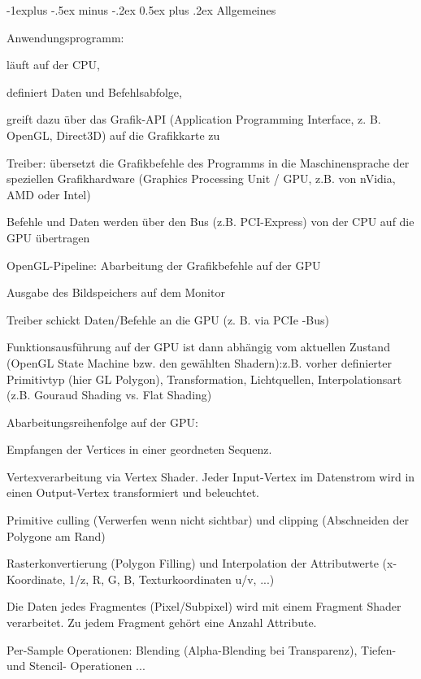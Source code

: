 \documentclass[landscape]{article}
\makeatletter
\renewcommand{\subsection}{\@startsection{subsection}{2}{0mm}%
                                {-1explus -.5ex minus -.2ex}%
                                {0.5ex plus .2ex}%
                                {\normalfont\normalsize\bfseries}}
\makeatother
\begin{document}
\begin{multicols}{3}
  \subsection{Allgemeines}
  \begin{itemize*}
    \item Anwendungsprogramm:
          \begin{itemize*}
            \item läuft auf der CPU,
            \item definiert Daten und Befehlsabfolge,
            \item greift dazu über das Grafik-API (Application Programming Interface, z. B. OpenGL, Direct3D) auf die Grafikkarte zu
          \end{itemize*}
    \item Treiber: übersetzt die Grafikbefehle des Programms in die Maschinensprache der speziellen Grafikhardware (Graphics Processing Unit / GPU, z.B. von nVidia, AMD oder Intel)
    \item Befehle und Daten werden über den Bus (z.B. PCI-Express) von der CPU auf die GPU übertragen
    \item OpenGL-Pipeline: Abarbeitung der Grafikbefehle auf der GPU
    \item Ausgabe des Bildspeichers auf dem Monitor
    \item Treiber schickt Daten/Befehle an die GPU (z. B. via PCIe -Bus)
    \item Funktionsausführung auf der GPU ist dann abhängig vom aktuellen Zustand (OpenGL State Machine bzw. den gewählten Shadern):z.B. vorher definierter Primitivtyp (hier GL Polygon), Transformation, Lichtquellen, Interpolationsart (z.B. Gouraud Shading vs. Flat Shading)
  \end{itemize*}
  
  Abarbeitungsreihenfolge auf der GPU:
  \begin{itemize*}
    \item Empfangen der Vertices in einer geordneten Sequenz.
    \item Vertexverarbeitung via Vertex Shader. Jeder Input-Vertex im Datenstrom wird in einen Output-Vertex transformiert und beleuchtet.
    \item Primitive culling (Verwerfen wenn nicht sichtbar) und clipping (Abschneiden der Polygone am Rand)
    \item Rasterkonvertierung (Polygon Filling) und Interpolation der Attributwerte (x-Koordinate, 1/z, R, G, B, Texturkoordinaten u/v, ...)
    \item Die Daten jedes Fragmentes (Pixel/Subpixel) wird mit einem Fragment Shader verarbeitet. Zu jedem Fragment gehört eine Anzahl Attribute.
    \item Per-Sample Operationen: Blending (Alpha-Blending bei Transparenz), Tiefen- und Stencil- Operationen ...
  \end{itemize*}
  

\end{multicols}
\end{document}
